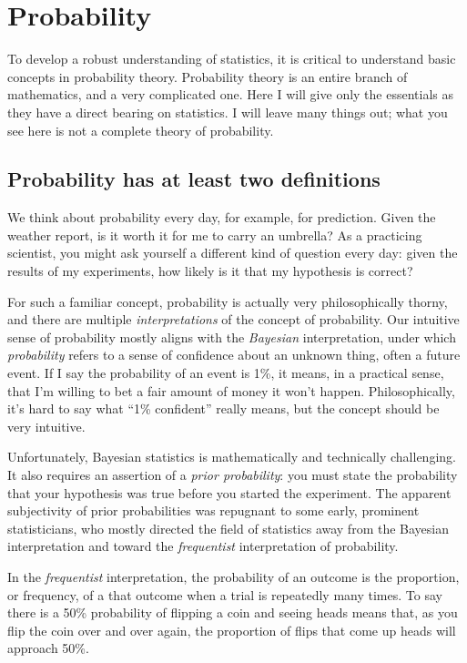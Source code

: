 
\chapter{Probability}
\label{chapter:probability}

To develop a robust understanding of statistics, it is critical to understand
basic concepts in probability theory. Probability theory is an entire branch of mathematics, and a very complicated one. Here I will give only the essentials as
they have a direct bearing on statistics. I will leave many things out; what you
see here is not a complete theory of probability.

\section{Probability has at least two definitions}

We think about probability every day, for example, for
prediction. Given the weather report, is it worth it for me to carry an
umbrella? As a practicing scientist, you might ask yourself a different
kind of question every day: given the results of my experiments, how
likely is it that my hypothesis is correct?

For such a familiar concept, probability is actually very philosophically
thorny, and there are multiple \emph{interpretations} of the concept of
probability. Our intuitive sense of probability mostly aligns with the
\emph{Bayesian} interpretation, under which \emph{probability} refers to
a sense of confidence
about an unknown thing, often a future event. If I say the probability of an
event is 1\%, it means, in a practical sense, that I'm willing to bet a fair
amount of money it won't happen. Philosophically, it's hard to say what ``1\%
confident'' really means, but the concept should be very intuitive.

Unfortunately, Bayesian statistics is mathematically and technically
challenging. It also requires an assertion of a \emph{prior probability}: you
must state the probability that your hypothesis was true before you started the
experiment. The apparent subjectivity of prior probabilities was repugnant to
some early, prominent statisticians, who mostly directed the field of statistics
away from the Bayesian interpretation and toward the \emph{frequentist}
interpretation of probability.

In the \emph{frequentist} interpretation, the probability of an outcome is
the proportion, or frequency, of a that outcome when a trial is repeatedly
many times. To say there is a 50\% probability of flipping a coin and seeing heads
means that, as you flip the coin over and over again, the proportion of
flips that come up heads will approach 50\%.

